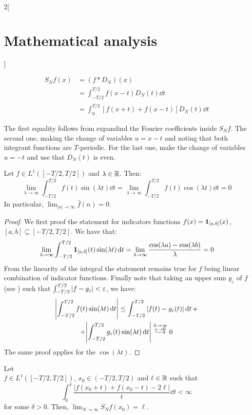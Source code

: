 \documentclass[../../../main_math.tex]{subfiles}
\begin{document}
\begin{multicols}{2}[\section{Mathematical analysis}]
\begin{proposition}
    \begin{align*}
      S_Nf(x) & =(f*D_N)(x)                              \\
              & =\int_{-T/2}^{T/2}f(x-t)D_N(t)\dd{t}     \\
              & =\int_0^{T/2}[f(x+t)+f(x-t)]D_N(t)\dd{t}
    \end{align*}
  \end{proposition}
  \begin{sproof}
    The first equality follows from expandind the Fourier coefficients inside $S_Nf$. The second one, making the change of variables $u=x-t$ and noting that both integrant functions are $T$-periodic. For the last one, make the change of variables $u=-t$ and use that $D_N(t)$ is even.
  \end{sproof}
  \begin{lemma}\label{MA:riemannlebesgue}
    Let $f\in L^1([-T/2,T/2])$ and $\lambda\in\mathbb{R} $. Then: $$\lim_{\lambda\to\infty}\int_{-T/2}^{T/2}f(t)\sin(\lambda t)\dd{t}=\lim_{\lambda\to\infty}\int_{-T/2}^{T/2}f(t)\cos(\lambda t)\dd{t}=0$$ In particular, $\displaystyle\lim_{|n|\to\infty}\widehat{f}(n)=0$.
  \end{lemma}
  \begin{proof}
    We first proof the statement for indicators functions $f(x)=\boldsymbol{\mathrm{1}}_{[a,b]}(x)$, $[a,b]\subseteq [-T/2,T/2]$. We have that:
    $$\lim_{\lambda\to\infty}\int_{-T/2}^{T/2}\boldsymbol{\mathrm{1}}_{[a,b]}(t)\sin(\lambda t)\dd{t}=\lim_{\lambda\to\infty}\frac{\cos(\lambda a)-\cos(\lambda b)}{\lambda}=0$$
    From the linearity of the integral the statement remains true for $f$ being linear combination of indicator functions. Finally note that taking an upper sum $g_\varepsilon$ of $f$ (see ) such that $\int_{-T/2}^{T/2}\abs{f-g_\varepsilon}<\varepsilon$, we have:
    \begin{multline*}
      \abs{\int_{-T/2}^{T/2}f(t)\sin(\lambda t)\dd{t}}\leq\int_{-T/2}^{T/2}\abs{f(t)-g_\varepsilon(t)}\dd{t}+\\+\abs{\int_{-T/2}^{T/2}g_\varepsilon(t)\sin(\lambda t)\dd{t}}\overset{\substack{\lambda\to\infty\\\varepsilon\to 0}}{\longrightarrow}0
    \end{multline*}
    The same proof applies for the $\cos(\lambda t)$.
  \end{proof}
  \begin{theorem}\label{MA:dini}
    Let \\$f\in L^1([-T/2,T/2])$, $x_0\in (-T/2,T/2)$ and $\ell\in\mathbb{R} $ such that $$\int_0^\delta\frac{|f(x_0+t)+f(x_0-t)-2\ell|}{t}\dd{t}<\infty$$ for some $\delta>0$. Then, $\displaystyle\lim_{N\to\infty}S_Nf(x_0)=\ell$.

\end{theorem}
\end{multicols}
\end{document}
